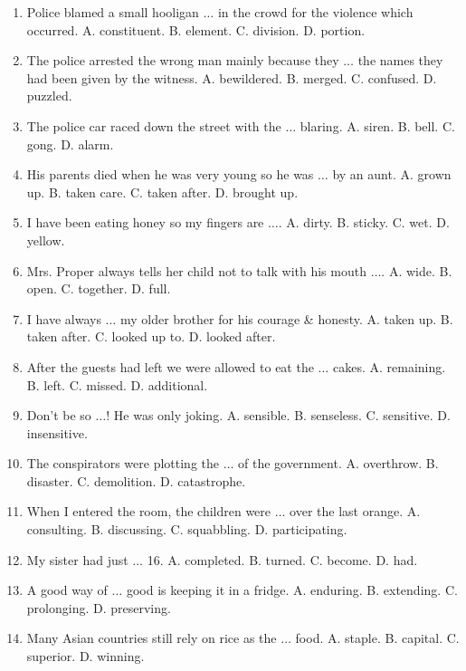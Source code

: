 \documentclass{article}
\numberwithin{equation}{section}
\begin{document}
\begin{enumerate}[leftmargin=8mm]
	\item Police blamed a small hooligan $\ldots$ in the crowd for the violence which occurred. {\sf A.} constituent. {\sf B.} element. {\sf C.} division. {\sf D.} portion.
	\item The police arrested the wrong man mainly because they $\ldots$ the names they had been given by the witness. {\sf A.} bewildered. {\sf B.} merged. {\sf C.} confused. {\sf D.} puzzled.
	\item The police car raced down the street with the $\ldots$ blaring. {\sf A.} siren. {\sf B.} bell. {\sf C.} gong. {\sf D.} alarm.
	\item His parents died when he was very young so he was $\ldots$ by an aunt. {\sf A.} grown up. {\sf B.} taken care. {\sf C.} taken after. {\sf D.} brought up.
	\item I have been eating honey so my fingers are $\ldots$. {\sf A.} dirty. {\sf B.} sticky. {\sf C.} wet. {\sf D.} yellow.
	\item Mrs. Proper always tells her child not to talk with his mouth $\ldots$. {\sf A.} wide. {\sf B.} open. {\sf C.} together. {\sf D.} full.
	\item I have always $\ldots$ my older brother for his courage \& honesty. {\sf A.} taken up. {\sf B.} taken after. {\sf C.} looked up to. {\sf D.} looked after.
	\item After the guests had left we were allowed to eat the $\ldots$ cakes. {\sf A.} remaining. {\sf B.} left. {\sf C.} missed. {\sf D.} additional.
	\item Don't be so $\ldots$! He was only joking. {\sf A.} sensible. {\sf B.} senseless. {\sf C.} sensitive. {\sf D.} insensitive.
	\item The conspirators were plotting the $\ldots$ of the government. {\sf A.} overthrow. {\sf B.} disaster. {\sf C.} demolition. {\sf D.} catastrophe.
	\item When I entered the room, the children were $\ldots$ over the last orange. {\sf A.} consulting. {\sf B.} discussing. {\sf C.} squabbling. {\sf D.} participating.
	\item My sister had just $\ldots$ 16. {\sf A.} completed. {\sf B.} turned. {\sf C.} become. {\sf D.} had.
	\item A good way of $\ldots$ good is keeping it in a fridge. {\sf A.} enduring. {\sf B.} extending. {\sf C.} prolonging. {\sf D.} preserving.
	\item Many Asian countries still rely on rice as the $\ldots$ food. {\sf A.} staple. {\sf B.} capital. {\sf C.} superior. {\sf D.} winning.

\end{enumerate}
\end{document}
